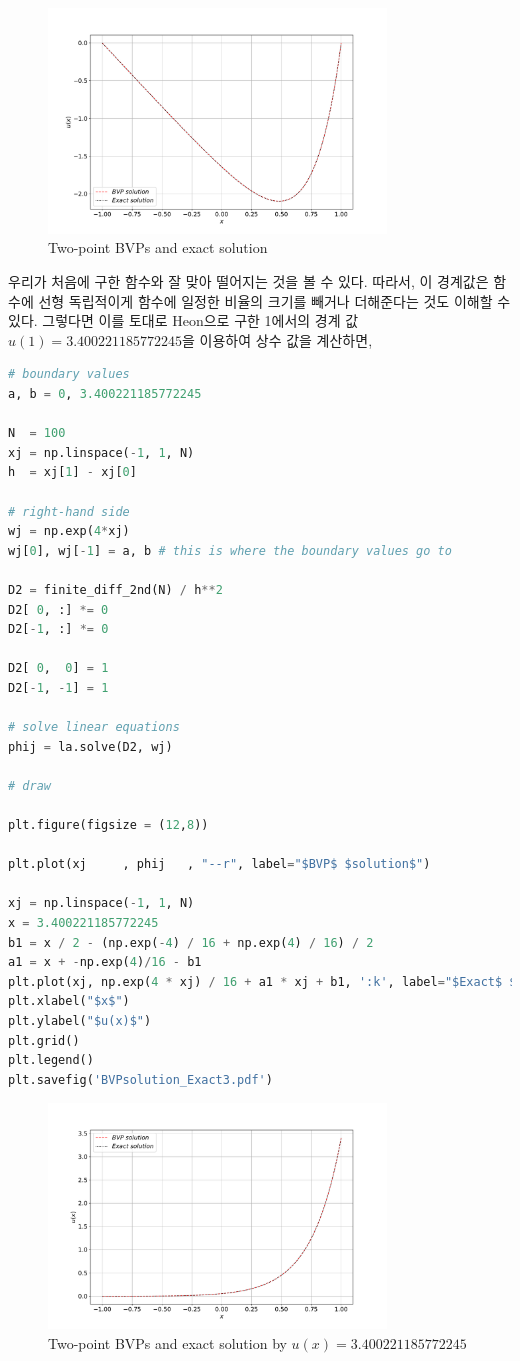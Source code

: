 \documentclass[11pt]{article}
\begin{document}
\begin{figure}[!ht]
  \centering
  \includegraphics[width=0.8\textwidth]{BVPsolution_Exact.pdf}
  \caption{Two-point BVPs and exact solution}
\end{figure}
우리가 처음에 구한 함수와 잘 맞아 떨어지는 것을 볼 수 있다. 따라서, 이 경계값은 함수에 선형 독립적이게 함수에 일정한 비율의 크기를 빼거나 더해준다는 것도 이해할 수 있다. 그렇다면 이를 토대로 Heon으로 구한 1에서의 경계 값 $u(1) = 3.400221185772245$을 이용하여 상수 값을 계산하면, 
\begin{lstlisting}[language=Python]
# boundary values
a, b = 0, 3.400221185772245

N  = 100
xj = np.linspace(-1, 1, N)
h  = xj[1] - xj[0]

# right-hand side
wj = np.exp(4*xj)
wj[0], wj[-1] = a, b # this is where the boundary values go to

D2 = finite_diff_2nd(N) / h**2
D2[ 0, :] *= 0
D2[-1, :] *= 0

D2[ 0,  0] = 1
D2[-1, -1] = 1

# solve linear equations
phij = la.solve(D2, wj)

# draw

plt.figure(figsize = (12,8))

plt.plot(xj     , phij   , "--r", label="$BVP$ $solution$")

xj = np.linspace(-1, 1, N)
x = 3.400221185772245
b1 = x / 2 - (np.exp(-4) / 16 + np.exp(4) / 16) / 2
a1 = x + -np.exp(4)/16 - b1
plt.plot(xj, np.exp(4 * xj) / 16 + a1 * xj + b1, ':k', label="$Exact$ $solution$")
plt.xlabel("$x$")
plt.ylabel("$u(x)$")
plt.grid()
plt.legend()
plt.savefig('BVPsolution_Exact3.pdf')
\end{lstlisting}

\begin{figure}[!ht]
  \centering
  \includegraphics[width=0.8\textwidth]{BVPsolution_Exact3.pdf}
  \caption{Two-point BVPs and exact solution by $u(x) =  3.400221185772245$}
\end{figure}
\end{document}
